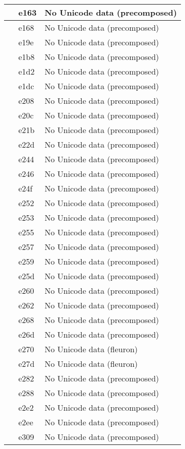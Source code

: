\documentclass[12pt,letterpaper,openany]{book}
\begin{document}
\begin{center}
\begin{supertabular}{|m{0.25in}|m{0.5in}|m{4in}|}
 & e163 & No Unicode data (precomposed)\\\hline
 & e168 & No Unicode data (precomposed)\\\hline
 & e19e & No Unicode data (precomposed)\\\hline
 & e1b8 & No Unicode data (precomposed)\\\hline
 & e1d2 & No Unicode data (precomposed)\\\hline
 & e1dc & No Unicode data (precomposed)\\\hline
 & e208 & No Unicode data (precomposed)\\\hline
 & e20c & No Unicode data (precomposed)\\\hline
 & e21b & No Unicode data (precomposed)\\\hline
 & e22d & No Unicode data (precomposed)\\\hline
 & e244 & No Unicode data (precomposed)\\\hline
 & e246 & No Unicode data (precomposed)\\\hline
 & e24f & No Unicode data (precomposed)\\\hline
 & e252 & No Unicode data (precomposed)\\\hline
 & e253 & No Unicode data (precomposed)\\\hline
 & e255 & No Unicode data (precomposed)\\\hline
 & e257 & No Unicode data (precomposed)\\\hline
 & e259 & No Unicode data (precomposed)\\\hline
 & e25d & No Unicode data (precomposed)\\\hline
 & e260 & No Unicode data (precomposed)\\\hline
 & e262 & No Unicode data (precomposed)\\\hline
 & e268 & No Unicode data (precomposed)\\\hline
 & e26d & No Unicode data (precomposed)\\\hline
 & e270 & No Unicode data (fleuron)\\\hline
 & e27d & No Unicode data (fleuron)\\\hline
 & e282 & No Unicode data (precomposed)\\\hline
 & e288 & No Unicode data (precomposed)\\\hline
 & e2e2 & No Unicode data (precomposed)\\\hline
 & e2ee & No Unicode data (precomposed)\\\hline
 & e309 & No Unicode data (precomposed)\\\hline

\end{supertabular}
\end{center}
\end{document}
